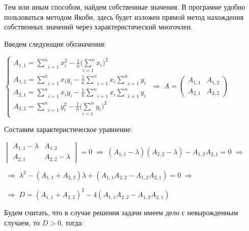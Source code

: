 Тем или иным способом, найдем собственные значения. В программе удобно пользоваться методом Якоби, здесь будет изложен прямой метод нахождения собственных значений через характеристический многочлен.

\vspace{0.5cm}
Введем следующие обозначения:

\begin{center}
	$\begin{cases}
		A_{1,1} = \underset{i=1}{\overset{n}{\sum}}x_i^2-\frac{1}{n}\underset{i=1}{(\overset{n}{\sum}} x_i)^2 
		\\
		A_{1,2} = \underset{i=1}{\overset{n}{\sum}}x_i y_i - \frac{1}{n}\underset{i=1}{\overset{n}{\sum}}x_i \underset{i=1}{\overset{n}{\sum}} y_i
		\\
		A_{2,1} = \underset{i=1}{\overset{n}{\sum}}x_i y_i - \frac{1}{n}\underset{i=1}{\overset{n}{\sum}}x_i \underset{i=1}{\overset{n}{\sum}} y_i
		\\
		A_{2,2} = \underset{i=1}{\overset{n}{\sum}}y_i^2-\frac{1}{n}\underset{i=1}{(\overset{n}{\sum}} y_i)^2
	\end{cases} \; \Rightarrow \; A = \begin{pmatrix}
		A_{1,1} & A_{1,2} \\ A_{2,1} & A_{2,2}
	\end{pmatrix}$
\end{center}

Составим характеристическое уравнение:

\begin{center}
	$\begin{vmatrix}
		A_{1,1}-\lambda & A_{1,2} \\ A_{2,1} & A_{2,2}-\lambda
	\end{vmatrix}=0 \; \Rightarrow \; (A_{1,1}-\lambda)(A_{2,2}-\lambda)-A_{1,2} A_{2,1} = 0 \; \Rightarrow \; $
\end{center}

\begin{center}
	$\; \Rightarrow \; \lambda^2 - (A_{1,1}+A_{2,2})\lambda + (A_{1,1} A_{2,2} - A_{1,2} A_{2,1}) = 0 \; \Rightarrow \;$
\end{center}

\begin{center}
	$\; \Rightarrow \; D = (A_{1,1}+A_{2,2})^2-4 (A_{1,1} A_{2,2} - A_{1,2} A_{2,1})$
\end{center}

Будем считать, что в случае решения задачи имеем дело с невырожденным случаем, то $D>0$, тогда:

